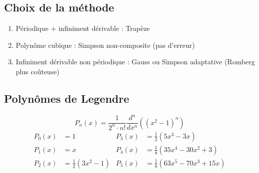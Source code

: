 \documentclass[resume]{subfiles}
\begin{document}
	\subsection{Choix de la méthode}
	\begin{enumerate}
	\item Périodique + infiniment dérivable : Trapèze
	\item Polynôme cubique : Simpson non-composite (pas d'erreur)
	\item Infiniment dérivable non périodique : Gauss ou Simpson adaptative (Romberg plus coûteuse)
	\end{enumerate}  
	\subsection{Polynômes de Legendre}
	$$P_n(x)=\frac{1}{2^n\cdot n!}\frac{d^n}{dx^n}\left((x^2-1)^n\right)$$
	\begin{align*}
	P_0(x)&=1& P_3(x)&=\frac{1}{2}(5x^3-3x)\\
	P_1(x)&=x & P_4(x)&=\frac{1}{8}(35x^4-30x^2+3) \\
	P_2(x)&=\frac{1}{2}(3x^2-1)& P_5(x)&=\frac{1}{8}(63x^5-70x^3+15x)
	\end{align*}
\end{document}
